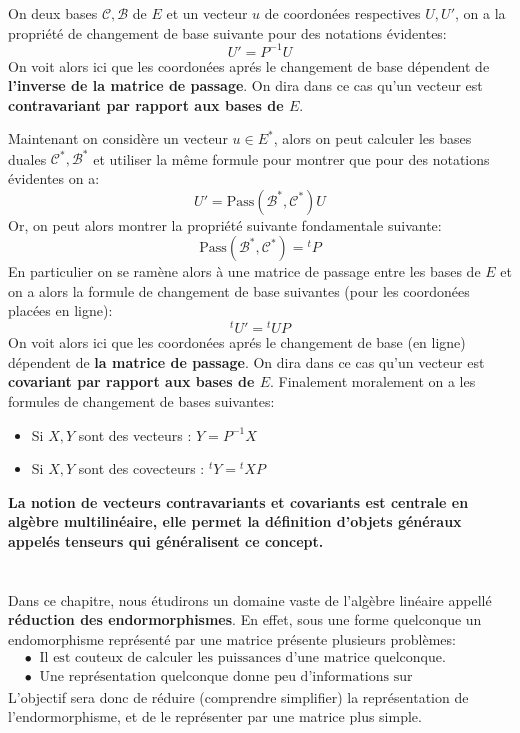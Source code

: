 \subsection*{}
On deux bases \( \mathscr{C}, \mathscr{B}\) de \(E\) et un vecteur \(u\) de coordonées respectives \(U, U'\), on a la propriété de changement de base suivante pour des notations évidentes:
\[
   U' = P^{-1}U
\]
On voit alors ici que les coordonées aprés le changement de base dépendent de \textbf{l'inverse de la matrice de passage}. On dira dans ce cas qu'un vecteur est \textbf{contravariant par rapport aux bases de \(E\)}.\<

Maintenant on considère un vecteur \(u \in E^*\), alors on peut calculer les bases duales \(\mathscr{C}^*, \mathscr{B}^*\) et utiliser la même formule pour montrer que pour des notations évidentes on a:
\[
   U' = \text{Pass}(\mathscr{B}^*, \mathscr{C}^*)U
\]
Or, on peut alors montrer la propriété suivante fondamentale suivante:
\[
   \text{Pass}(\mathscr{B}^*, \mathscr{C}^*) = {}^tP
\]
En particulier on se ramène alors à une matrice de passage entre les bases de \(E\) et on a alors la formule de changement de base suivantes (pour les coordonées placées en ligne):
\[
   {}^tU' = {}^tUP
\]
On voit alors ici que les coordonées aprés le changement de base (en ligne) dépendent de \textbf{la matrice de passage}. On dira dans ce cas qu'un vecteur est \textbf{covariant par rapport aux bases de \(E\)}. Finalement moralement on a les formules de changement de bases suivantes:

\begin{itemize}
   \item Si \(X, Y\) sont des vecteurs : \(Y = P^{-1}X\)
   \item Si \(X, Y\) sont des covecteurs : \({}^tY = {}^tXP\)
\end{itemize}
\begin{center}
   \textbf{La notion de vecteurs contravariants et covariants est centrale en algèbre multilinéaire, elle permet la définition d'objets généraux appelés tenseurs qui généralisent ce concept.}
\end{center}

\chapter*{}
Dans ce chapitre, nous étudirons un domaine vaste de l'algèbre linéaire appellé \textbf{réduction des endormorphismes}.\+
En effet, sous une forme quelconque un endomorphisme représenté par une matrice présente plusieurs problèmes:
\begin{align*}
   &\bullet \;\; \text{Il est couteux de calculer les puissances d'une matrice quelconque.} \\
   &\bullet \;\; \text{Une représentation quelconque donne peu d'informations sur l'endomorphisme.}
\end{align*}
L'objectif sera donc de réduire (comprendre simplifier) la représentation de l'endormorphisme, et de le représenter par une matrice plus simple. \<

